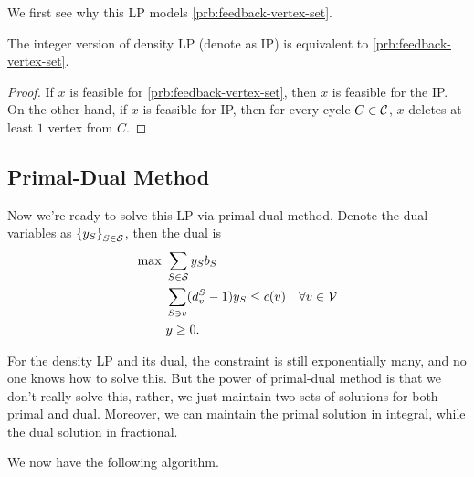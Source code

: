 We first see why this LP models \autoref{prb:feedback-vertex-set}.

\begin{lemma}\label{lma:lec4-1}
	The integer version of density LP (denote as IP) is equivalent to \autoref{prb:feedback-vertex-set}.
\end{lemma}
\begin{proof}
	If \(x\) is feasible for \autoref{prb:feedback-vertex-set}, then \(x\) is feasible for the IP. On the other hand, if \(x\) is feasible for IP, then for every cycle \(C\in \mathcal{\MakeUppercase{C}} \), \(x\) deletes at least \(1\) vertex from \(C\).
\end{proof}

\subsection{Primal-Dual Method}
Now we're ready to solve this LP via primal-dual method. Denote the dual variables as \(\left\{ y_S \right\} _{S\in \mathcal{\MakeUppercase{S}} }\), then the dual is
\[
	\begin{aligned}
		\max~ & \sum_{S\in \mathcal{\MakeUppercase{S}} } y_S b_S                                       \\
		      & \sum_{S\ni v}(d_{v} ^S - 1)y_S \leq c(v)\quad \forall v\in \mathcal{\MakeUppercase{v}} \\
		      & y\geq 0.
	\end{aligned}
\]

\begin{note}
	For the density LP and its dual, the constraint is still exponentially many, and no one knows how to solve this. But the power of primal-dual method is that we don't really solve this, rather, we just maintain two sets of solutions for both primal and dual. Moreover, we can maintain the primal solution in integral, while the dual solution in fractional.
\end{note}

We now have the following algorithm.\par

